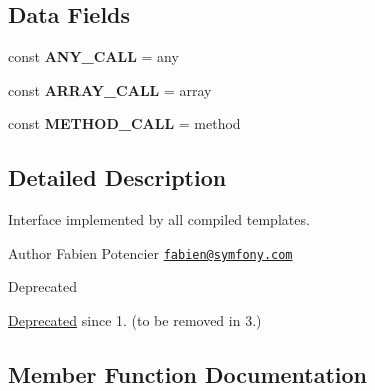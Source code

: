 \subsection*{Data Fields}
\begin{DoxyCompactItemize}
\item 
\hypertarget{interface_twig___template_interface_afbad1c07ee4c5a6ab24612dd1e419c80}{}const {\bfseries A\+N\+Y\+\_\+\+C\+A\+L\+L} = \textquotesingle{}any\textquotesingle{}\label{interface_twig___template_interface_afbad1c07ee4c5a6ab24612dd1e419c80}

\item 
\hypertarget{interface_twig___template_interface_a3458e5e24f091e589f85fdf4e3f270d9}{}const {\bfseries A\+R\+R\+A\+Y\+\_\+\+C\+A\+L\+L} = \textquotesingle{}array\textquotesingle{}\label{interface_twig___template_interface_a3458e5e24f091e589f85fdf4e3f270d9}

\item 
\hypertarget{interface_twig___template_interface_a296b9e68df98717f0c552180d8770665}{}const {\bfseries M\+E\+T\+H\+O\+D\+\_\+\+C\+A\+L\+L} = \textquotesingle{}method\textquotesingle{}\label{interface_twig___template_interface_a296b9e68df98717f0c552180d8770665}

\end{DoxyCompactItemize}


\subsection{Detailed Description}
Interface implemented by all compiled templates.

\begin{DoxyAuthor}{Author}
Fabien Potencier \href{mailto:fabien@symfony.com}{\tt fabien@symfony.\+com}
\end{DoxyAuthor}
\begin{DoxyRefDesc}{Deprecated}
\item[\hyperlink{deprecated__deprecated000020}{Deprecated}]since 1. (to be removed in 3.) \end{DoxyRefDesc}


\subsection{Member Function Documentation}
\hypertarget{interface_twig___template_interface_a056b93bf930a9629d3a96234ce462f20}{}
